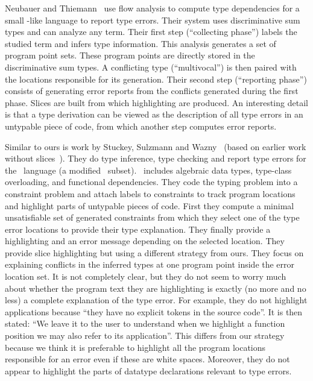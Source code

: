 \documentclass{jfp1}
\begin{document}
Neubauer and
Thiemann~\cite{Neubauer+Thiermann:2003}  use flow analysis to
compute type dependencies for a small \ML-like language to report
type errors.  Their system uses discriminative sum types and can
analyze any term.  Their
first step (``collecting phase'') labels
the studied term and infers type information.  This
analysis generates a set of program point sets.  These program
points are directly stored in the discriminative sum types.  A
conflicting type (``multivocal'') is then paired with the locations
responsible for its generation.  Their second step
(``reporting phase'') consists of generating error reports from the
conflicts generated during the first phase.  Slices are built from
which highlighting are produced.  An interesting detail
is that a type derivation can be viewed as the
description of all type errors in an untypable piece of code, from
which another step
computes error reports.


Similar to ours is work by Stuckey, Sulzmann
and Wazny~\cite{Stuckey+Sulzmann+Wazny:2006,Wazny:2006}
(based on earlier work without
slices~\cite{Stuckey+Sulzmann+Wazny:2003,Stuckey+Sulzmann+Wazny:2004}).
They do type inference, type checking and report type errors for the
\CHAMELEON\ language (a modified \HASKELL\ subset).  \CHAMELEON\
includes
algebraic data types,
type-class overloading, and functional dependencies.
They code the typing problem into a constraint
problem
and attach labels to constraints to track program locations
and
highlight parts of untypable pieces of code.  First they compute a
minimal unsatisfiable set of generated constraints from which they
select one of the type error locations to provide their type
explanation.  They finally provide a highlighting and an error message
depending on the selected location.  They provide slice highlighting
but using a different strategy from ours.
They focus
on explaining conflicts in the inferred types at one program
point inside the error location set.
It is not completely clear, but they do not seem to worry much
about whether the program text they are highlighting is exactly (no more and
no less) a complete explanation of the type error.
For example, they do not highlight applications
because ``they have no explicit tokens in the source code''.  It is
then stated: ``We leave it to the user to understand when we highlight
a function position we may also refer to its application''.  This
differs from our strategy because
we think it is preferable to highlight all the
program locations responsible for an error even if these are
white spaces.
Moreover, they do not appear to highlight the parts of
datatype declarations relevant to type errors.
%
\end{document}
